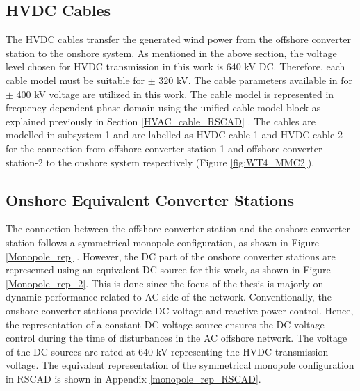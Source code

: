 
\subsection{\gls{HVDC} Cables}
The \gls{HVDC} cables transfer the generated wind power from the offshore converter station to the onshore system. As mentioned in the above section, the voltage level chosen for \gls{HVDC} transmission in this work is 640 kV \gls{DC}. Therefore, each cable model must be suitable for $\pm$ 320 kV. The cable parameters available in \cite{vrana2013cigre} for $\pm$ 400 kV voltage are utilized in this work. The cable model is represented in frequency-dependent phase domain using the unified cable model block as explained previously in Section \ref{HVAC_cable_RSCAD} \cite{rtds_tech}. The cables are modelled in subsystem-1 and are labelled as \gls{HVDC} cable-1 and \gls{HVDC} cable-2 for the connection from offshore converter station-1 and offshore converter station-2 to the onshore system  respectively (Figure \ref{fig:WT4_MMC2}). 

\subsection{Onshore Equivalent Converter Stations}
The connection between the offshore converter station and the onshore converter station follows a symmetrical monopole configuration, as shown in Figure \ref{Monopole_rep} \cite{sharifabadi2016design}. However, the \gls{DC} part of the onshore converter stations are represented using an equivalent \gls{DC} source for this work, as shown in Figure \ref{Monopole_rep_2}. This is done since the focus of the thesis is majorly on dynamic performance related to \gls{AC} side of the network. Conventionally, the onshore converter stations provide \gls{DC} voltage and reactive power control. Hence, the representation of a constant \gls{DC} voltage source ensures the \gls{DC} voltage control during the time of disturbances in the \gls{AC} offshore network. The voltage of the \gls{DC} sources are rated at 640 kV representing the \gls{HVDC} transmission voltage. The equivalent representation of the symmetrical monopole configuration in RSCAD is shown in Appendix \ref{monopole_rep_RSCAD}.  

